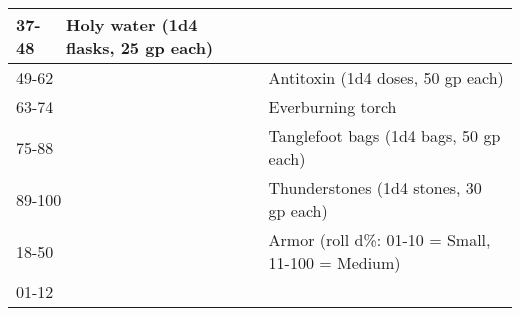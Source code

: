 \begin{longtable}{llll}
{\begin{minipage}[t]{3.276in}
37-48\end{minipage}} & \multicolumn{1}{|p{0.896in}|}{\begin{minipage}[t]{0.896in}\raggedright
Holy water (1d4 flasks, 25 gp each)\end{minipage}}\\
\hline
\multicolumn{3}{p{3.276in}|}{\begin{minipage}[t]{3.276in}\raggedright
49-62\end{minipage}} & \multicolumn{1}{|p{0.896in}|}{\begin{minipage}[t]{0.896in}\raggedright
Antitoxin (1d4 doses, 50 gp each)\end{minipage}}\\
\hline
\multicolumn{3}{p{3.276in}|}{\begin{minipage}[t]{3.276in}\raggedright
63-74\end{minipage}} & \multicolumn{1}{|p{0.896in}|}{\begin{minipage}[t]{0.896in}\raggedright
Everburning torch\end{minipage}}\\
\hline
\multicolumn{3}{p{3.276in}|}{\begin{minipage}[t]{3.276in}\raggedright
75-88\end{minipage}} & \multicolumn{1}{|p{0.896in}|}{\begin{minipage}[t]{0.896in}\raggedright
Tanglefoot bags (1d4 bags, 50 gp each)\end{minipage}}\\
\hline
\multicolumn{3}{p{3.276in}|}{\begin{minipage}[t]{3.276in}\raggedright
89-100\end{minipage}} & \multicolumn{1}{|p{0.896in}|}{\begin{minipage}[t]{0.896in}\raggedright
Thunderstones (1d4 stones, 30 gp each)\end{minipage}}\\
\hline
\multicolumn{3}{p{3.276in}|}{\begin{minipage}[t]{3.276in}\raggedright
18-50\end{minipage}} & \multicolumn{1}{|p{0.896in}|}{\begin{minipage}[t]{0.896in}\raggedright
Armor (roll d\%: 01-10 = Small, 11-100 = Medium)\end{minipage}}\\
\hline
\multicolumn{3}{p{3.276in}|}{\begin{minipage}[t]{3.276in}\raggedright
01-12\end{minipage}} & \multicolumn{1}{|p{0.896in}|}{\begin{minipage}[t]{0.896in}\raggedright

\end{minipage}}
\end{longtable}
